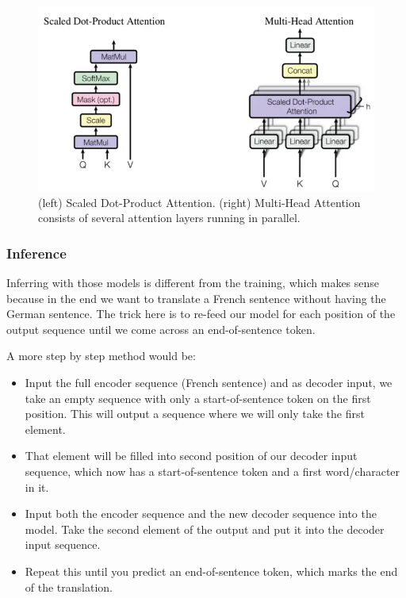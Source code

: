 \begin{figure}[H]
	\centering
	\includegraphics[width=\textwidth]{
		images/16_DeepLearning_multiHeadAttentionBricks.png
	}
	\caption{(left) Scaled Dot-Product Attention. (right) Multi-Head Attention consists
	of several attention layers running in parallel.}
	\label{fig:multiHeadAttentionBricks}
\end{figure}

\subsubsection{Inference}
Inferring with those models is different from the training, which makes sense
because in the end we want to translate a French sentence without having the
German sentence. The trick here is to re-feed our model for each position of the
output sequence until we come across an end-of-sentence token.
\newline

A more step by step method would be:
\begin{itemize}
	\item Input the full encoder sequence (French sentence) and as decoder input,
		we take an empty sequence with only a start-of-sentence token on the first
		position. This will output a sequence where we will only take the first element.

	\item That element will be filled into second position of our decoder input sequence,
		which now has a start-of-sentence token and a first word/character in it.

	\item Input both the encoder sequence and the new decoder sequence into the model.
		Take the second element of the output and put it into the decoder input
		sequence.

	\item Repeat this until you predict an end-of-sentence token, which marks the
		end of the translation.
\end{itemize}

